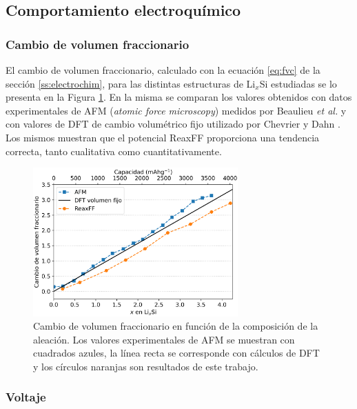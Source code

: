 \subsection{Comportamiento electroquímico}

\subsubsection{Cambio de volumen fraccionario}

El cambio de volumen fraccionario, calculado con la ecuación \ref{eq:fvc} de la 
sección \ref{ss:electrochim}, para las distintas estructuras de Li$_x$Si estudiadas 
se lo presenta en la Figura \ref{fig:fvc}. En la misma se comparan los valores 
obtenidos con datos experimentales de AFM (\textit{atomic force microscopy}) 
medidos por Beaulieu \textit{et al.} \cite{beaulieu2003} y con valores de DFT 
de cambio volumétrico fijo utilizado por Chevrier y Dahn \cite{chevrier2009}. 
Los mismos muestran que el potencial ReaxFF proporciona una tendencia correcta, 
tanto cualitativa como cuantitativamente.
\begin{figure}[h!]
    \centering
    \includegraphics[width=0.7\textwidth]{Silicio/caracterizacion/resultados/electroquimica/fvc.png}
    \caption{Cambio de volumen fraccionario en función de la composición de la 
    aleación. Los valores experimentales de AFM se muestran con cuadrados azules, 
    la línea recta se corresponde con cálculos de DFT y los círculos naranjas son 
    resultados de este trabajo.}
    \label{fig:fvc}
\end{figure}

\subsubsection{Voltaje}

